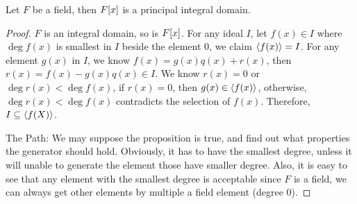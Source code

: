 \documentclass[../main.tex]{subfiles}
\begin{document}
\setcounter{theorem}{3}
\begin{theorem}
  Let $F$ be a field, then $F[x]$ is a principal integral domain.
\end{theorem}
\begin{proof}
  $F$ is an integral domain, so is $F[x]$.
  For any ideal $I$, let $f(x) \in I$ where $\deg f(x)$ is smallest in $I$ beside the element $0$,
  we claim $\langle f(x) \rangle = I$. For any element $g(x)$ in $I$, we know $f(x) = g(x)q(x) + r(x)$,
  then $r(x) = f(x) - g(x)q(x) \in I$.
  We know $r(x) = 0$ or $\deg r(x) < \deg f(x)$, if $r(x) = 0$, then $g(x) \in \langle f(x) \rangle$,
  otherwise, $\deg r(x) < \deg f(x)$ contradicts the selection of $f(x)$.
  Therefore, $I \subseteq \langle f(X) \rangle$.

  The Path: We may suppose the proposition is true, and find out what properties
  the generator should hold. Obviously, it has to have the smallest degree, unless
  it will unable to generate the element those have smaller degree. Also, it is
  easy to see that any element with the smallest degree is acceptable since $F$ is a field,
  we can always get other elements by multiple a field element (degree $0$).
\end{proof}
\end{document}
